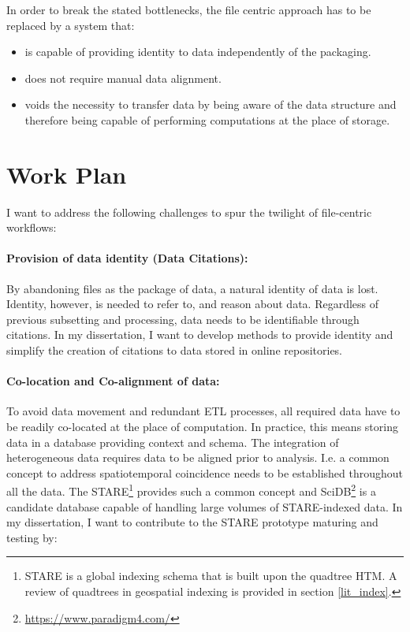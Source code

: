 \documentclass[a4paper,10pt]{article}
\begin{document}
\vspace{1cm}

In order to break the stated bottlenecks, the file centric approach has to be replaced by a system that:
\begin{itemize}
    \item is capable of providing identity to data independently of the packaging.
    \item does not require manual data alignment.
    \item voids the necessity to transfer data by being aware of the data structure and therefore being capable of performing computations at the place of storage.
\end{itemize}


\newpage

\section{Work Plan}
I want to address the following challenges to spur the twilight of file-centric workflows:

\paragraph{Provision of data identity (Data Citations):}
By abandoning files as the package of data, a natural identity of data is lost. Identity, however, is needed to refer to, and reason about data. Regardless of previous subsetting and processing, data needs to be identifiable through citations. In my dissertation, I want to develop methods to provide identity and simplify the creation of citations to data stored in online repositories.

\paragraph{Co-location and Co-alignment of data:}
To avoid data movement and redundant \gls{ETL} processes, all required data have to be readily co-located at the place of computation. In practice, this means storing data in a database providing context and schema.
The integration of heterogeneous data requires data to be aligned prior to analysis. I.e. a common concept to address spatiotemporal coincidence needs to be established throughout all the data. The \gls{STARE}\footnote{STARE is a global indexing schema that is built upon the quadtree \gls{HTM}. A review of quadtrees in geospatial indexing is provided in section \ref{lit_index}.} provides such a common concept and SciDB\footnote{\url{https://www.paradigm4.com/}} is a candidate database capable of handling large volumes of \gls{STARE}-indexed data.
In my dissertation, I want to contribute to the \gls{STARE} prototype maturing and testing by:
\end{document}

